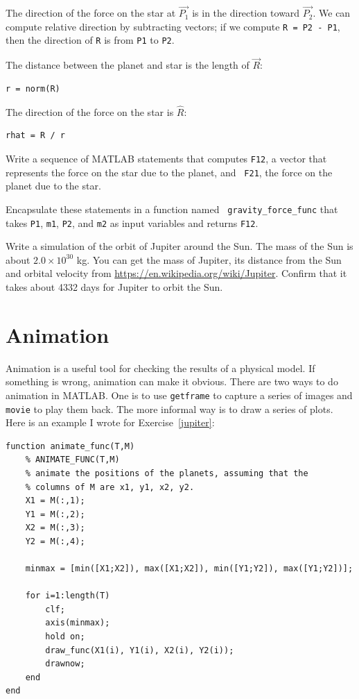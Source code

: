 \documentclass{book}
\newcommand{\uvec}[1]{\hat{#1}}
\begin{document}
The direction of the force on the star at $\vec{P_1}$ is in the
direction toward $\vec{P_2}$.  We can compute relative direction by
subtracting vectors; if we compute {\tt R = P2 - P1}, then
the direction of {\tt R} is from {\tt P1} to {\tt P2}.

The distance between the planet and star is the length of $\vec{R}$:

\begin{verbatim}
r = norm(R)
\end{verbatim}

The direction of the force on the star is $\uvec{R}$:

\begin{verbatim}
rhat = R / r
\end{verbatim}

\begin{ex}
Write a sequence of MATLAB statements that computes {\tt F12}, a vector
that represents the force on the star due to the planet, and {\tt
F21}, the force on the planet due to the star.
\end{ex}

\begin{ex}
Encapsulate these statements in a function named {\tt
gravity\_force\_func} that takes {\tt P1}, {\tt m1}, {\tt P2}, and
{\tt m2} as input variables and returns {\tt F12}.
\end{ex}

\begin{ex}
\label{jupiter}
Write a simulation of the orbit of Jupiter around the Sun.  The mass
of the Sun is about $2.0 \times 10^{30}$ kg.  You can get the mass of
Jupiter, its distance from the Sun and orbital velocity from
\url{https://en.wikipedia.org/wiki/Jupiter}.  Confirm that it takes
about 4332 days for Jupiter to orbit the Sun.
\end{ex}

\section{Animation}

Animation is a useful tool for checking the results of a physical
model.  If something is wrong, animation can make it obvious.
There are two ways to do animation in MATLAB.  One is to use
{\tt getframe} to capture a series of images and {\tt movie} to
play them back.
The more informal way is to draw a series of plots.
Here is an example I wrote for Exercise~\ref{jupiter}:

\begin{verbatim}
function animate_func(T,M)
    % ANIMATE_FUNC(T,M)
    % animate the positions of the planets, assuming that the
    % columns of M are x1, y1, x2, y2.
    X1 = M(:,1);
    Y1 = M(:,2);
    X2 = M(:,3);
    Y2 = M(:,4);

    minmax = [min([X1;X2]), max([X1;X2]), min([Y1;Y2]), max([Y1;Y2])];

    for i=1:length(T)
        clf;
        axis(minmax);
        hold on;
        draw_func(X1(i), Y1(i), X2(i), Y2(i));
        drawnow;
    end
end
\end{verbatim}
\end{document}
